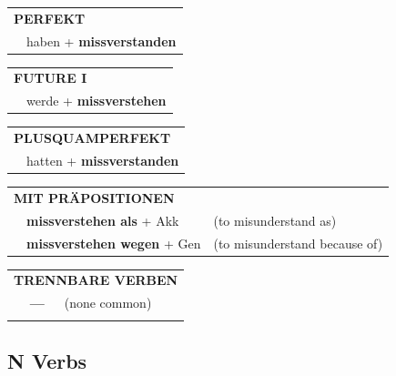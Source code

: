 \documentclass[10pt,a4paper]{revtex4-2}
\begin{document}
\begin{verbbox}
 \begin{tabular}{rl}
     \multicolumn{2}{l}{\textbf{PERFEKT}}\\
   & haben + \textbf{missverstanden}\\
  \end{tabular}
\hfill
   \begin{tabular}{rl}
    \multicolumn{2}{l}{\textbf{FUTURE I} }\\
   & werde + \textbf{missverstehen}\\
  \end{tabular}
\hfill
   \begin{tabular}{rl}
      \multicolumn{2}{l}{\textbf{PLUSQUAMPERFEKT}}\\
   & hatten + \textbf{missverstanden}\\
  \end{tabular}

   \vspace{10pt}

   \begin{tabular}{lll}
      \multicolumn{3}{l}{\textbf{MIT PRÄPOSITIONEN}}\\
& \textbf{missverstehen als} + Akk & (to misunderstand as)\\
& \textbf{missverstehen wegen} + Gen & (to misunderstand because of)\\
\end{tabular}
  \hfill
   \begin{tabular}{lll}
      \multicolumn{3}{l}{\textbf{TRENNBARE VERBEN}}\\
 & \textbf{---} & (none common)\\
\vspace{10pt}
  \end{tabular}

  \vspace{-5pt}

\end{verbbox}

\subsection{N Verbs}
\end{document}
